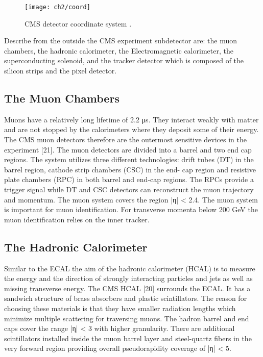 \begin{figure}[h!]
	\centering
	\texttt{[image: ch2/coord]}
	\caption[CMS detector coordinate system]{CMS detector coordinate system \cite{and_the}.}
	\label{fig:coord}
\end{figure}

Describe from the outside the CMS experiment subdetector are: the muon chambers, the hadronic calorimeter, the Electromagnetic calorimeter, the superconducting solenoid, and the tracker detector which is composed of the silicon strips and the pixel detector.

\subsection{The Muon Chambers}
Muons have a relatively long lifetime of 2.2 μs. They interact weakly with matter and are
not stopped by the calorimeters where they deposit some of their energy. The CMS muon
detectors therefore are the outermost sensitive devices in the experiment [21]. The muon
detectors are divided into a barrel and two end cap regions. The system utilizes three different
technologies: drift tubes (DT) in the barrel region, cathode strip chambers (CSC) in the end-
cap region and resistive plate chambers (RPC) in both barrel and end-cap regions. The RPCs
provide a trigger signal while DT and CSC detectors can reconstruct the muon trajectory and
momentum. The muon system covers the region |η| < 2.4. The muon system is important for
muon identification. For transverse momenta below 200 GeV the muon identification relies on
the inner tracker.
\subsection{The Hadronic Calorimeter}

Similar to the ECAL the aim of the hadronic calorimeter (HCAL) is to measure the energy
and the direction of strongly interacting particles and jets as well as missing transverse energy.
The CMS HCAL [20] surrounds the ECAL. It has a sandwich structure of brass absorbers and
plastic scintillators. The reason for choosing these materials is that they have smaller radiation
lengths which minimize multiple scattering for traversing muons. The hadron barrel and end
caps cover the range |η| < 3 with higher granularity. There are additional scintillators installed
inside the muon barrel layer and steel-quartz fibers in the very forward region providing overall
pseudorapidity coverage of |η| < 5.

